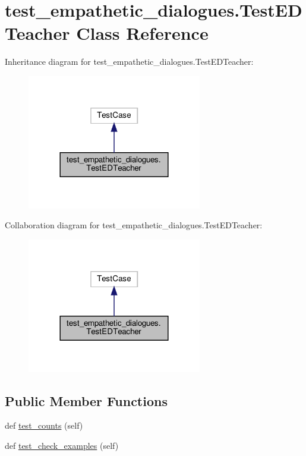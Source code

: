 \hypertarget{classtest__empathetic__dialogues_1_1TestEDTeacher}{}\section{test\+\_\+empathetic\+\_\+dialogues.\+Test\+E\+D\+Teacher Class Reference}
\label{classtest__empathetic__dialogues_1_1TestEDTeacher}


Inheritance diagram for test\+\_\+empathetic\+\_\+dialogues.\+Test\+E\+D\+Teacher\+:
\nopagebreak
\begin{figure}[H]
\begin{center}
\leavevmode
\includegraphics[width=216pt]{d0/d4d/classtest__empathetic__dialogues_1_1TestEDTeacher__inherit__graph}
\end{center}
\end{figure}


Collaboration diagram for test\+\_\+empathetic\+\_\+dialogues.\+Test\+E\+D\+Teacher\+:
\nopagebreak
\begin{figure}[H]
\begin{center}
\leavevmode
\includegraphics[width=216pt]{df/d8c/classtest__empathetic__dialogues_1_1TestEDTeacher__coll__graph}
\end{center}
\end{figure}
\subsection*{Public Member Functions}
\begin{DoxyCompactItemize}
\item 
def \hyperlink{classtest__empathetic__dialogues_1_1TestEDTeacher_a7c4ed6219d6095fca68c1140fe087d05}{test\+\_\+counts} (self)
\item 
def \hyperlink{classtest__empathetic__dialogues_1_1TestEDTeacher_a51cf9a7b2adb6521bcedde034d8b8efb}{test\+\_\+check\+\_\+examples} (self)
\end{DoxyCompactItemize}


